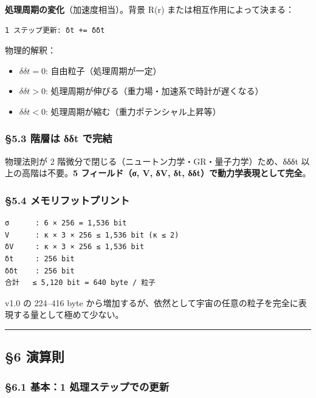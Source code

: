 \documentclass[a4paper,11pt]{ltjsarticle}
\providecommand{\tightlist}{\setlength{\itemsep}{0pt}\setlength{\parskip}{0pt}}
\begin{document}
\textbf{処理周期の変化}（加速度相当）。背景 R(r)
または相互作用によって決まる：

\begin{verbatim}
1 ステップ更新: δt += δδt
\end{verbatim}

物理的解釈：

\begin{itemize}
\tightlist
\item
  \(\delta\delta t = 0\): 自由粒子（処理周期が一定）
\item
  \(\delta\delta t > 0\):
  処理周期が伸びる（重力場・加速系で時計が遅くなる）
\item
  \(\delta\delta t < 0\): 処理周期が縮む（重力ポテンシャル上昇等）
\end{itemize}

\subsubsection{§5.3 階層は δδt
で完結}\label{ux968eux5c64ux306f-ux3b4ux3b4t-ux3067ux5b8cux7d50}

物理法則が 2 階微分で閉じる（ニュートン力学・GR・量子力学）ため、δδδt
以上の高階は不要。\textbf{5 フィールド（σ, V, δV, δt,
δδt）で動力学表現として完全}。

\subsubsection{§5.4
メモリフットプリント}\label{ux30e1ux30e2ux30eaux30d5ux30c3ux30c8ux30d7ux30eaux30f3ux30c8}

\begin{verbatim}
σ      : 6 × 256 = 1,536 bit
V      : κ × 3 × 256 ≤ 1,536 bit (κ ≤ 2)
δV     : κ × 3 × 256 ≤ 1,536 bit
δt     : 256 bit
δδt    : 256 bit
合計   ≤ 5,120 bit = 640 byte / 粒子
\end{verbatim}

v1.0 の 224--416 byte
から増加するが、依然として宇宙の任意の粒子を完全に表現する量として極めて少ない。

\begin{center}\rule{0.5\linewidth}{0.5pt}\end{center}

\subsection{§6 演算則}\label{ux6f14ux7b97ux5247}

\subsubsection{§6.1 基本：1
処理ステップでの更新}\label{ux57faux672c1-ux51e6ux7406ux30b9ux30c6ux30c3ux30d7ux3067ux306eux66f4ux65b0}
\end{document}
